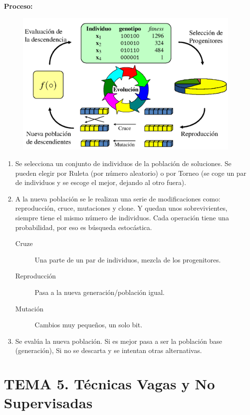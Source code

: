 \documentclass[12pt]{report} %
\begin{document}
\textbf{Proceso:}
\begin{figure}[H]
	{\includegraphics[scale=.3]{2021-03-19 11_42_34-otras-tecnicas.pdf - Foxit Reader.png}}
\end{figure}
\begin{enumerate}
  \item Se selecciona un conjunto de individuos de la población de soluciones. Se pueden elegir por Ruleta (por número aleatorio) o por Torneo (se coge un par de individuos y se escoge el mejor, dejando al otro fuera).
  \item A la nueva población se le realizan una serie de modificaciones como: reproducción, cruce, mutaciones y clone. Y quedan unos sobrevivientes, siempre tiene el mismo número de individuos.
  Cada operación tiene una probabilidad, por eso es búsqueda estocástica.
  \begin{description}
    \item[Cruze] Una parte de un par de individuos, mezcla de los progenitores.
    \item[Reproducción] Pasa a la nueva generación/población igual.
    \item[Mutación] Cambios muy pequeños, un solo bit.
  \end{description}
  \item Se evalúa la nueva población. Si es mejor pasa a ser la población base (generación), Si no se descarta y se intentan otras alternativas.
\end{enumerate}

\chapter{TEMA 5. Técnicas Vagas y No Supervisadas}
\end{document}

